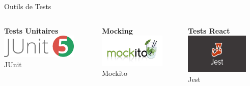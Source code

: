 \documentclass[aspectratio=169]{beamer}
\begin{document}
\begin{frame}{Outils de Tests}
    \begin{columns}
        \begin{center}
            \textbf{Tests Unitaires}\\[0.5cm]
            \includegraphics[width=0.8\textwidth]{latex_media/media/junit.png}\\
            \small JUnit
        \end{center}

        \begin{center}
            \textbf{Mocking}\\[0.5cm]
            \includegraphics[width=0.8\textwidth]{latex_media/media/mockito.png}\\
            \small Mockito
        \end{center}

        \begin{center}
            \textbf{Tests React}\\[0.5cm]
            \includegraphics[width=0.8\textwidth]{latex_media/media/jest_react_test.png}\\
            \small Jest
        \end{center}


\end{columns}
\end{frame}
\end{document}
